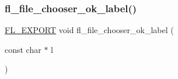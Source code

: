 \subsubsection{\texorpdfstring{fl\+\_\+file\+\_\+chooser\+\_\+ok\+\_\+label()}{fl\_file\_chooser\_ok\_label()}}
{\footnotesize\ttfamily \hyperlink{_fl___export_8_h_aa9ba29a18aee9d738370a06eeb4470fc}{F\+L\+\_\+\+E\+X\+P\+O\+RT} void fl\+\_\+file\+\_\+chooser\+\_\+ok\+\_\+label (\begin{DoxyParamCaption}\item[{const char $\ast$}]{l }\end{DoxyParamCaption})}

